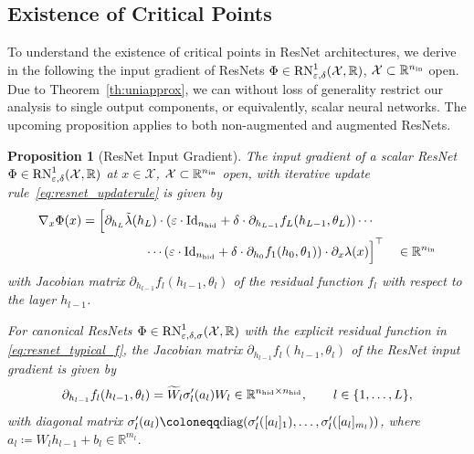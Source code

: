 \documentclass[10pt]{article}
\newtheorem{proposition}[theorem]{Proposition}
\theoremstyle{definition}
\numberwithin{equation}{section}
\newcommand{\eps}{\varepsilon}
\newcommand{\R}{\mathbb{R}}
\newcommand*{\nhid}{n_\textup{hid}}
\newcommand*{\nin}{n_\textup{in}}
\begin{document}
\subsection{Existence of Critical Points}
\label{sec:resnet_gradient}

To understand the existence of critical points in ResNet architectures, we derive in the following the input gradient of ResNets $\Phi \in \textup{RN}_{\eps,\delta}^1(\mathcal{X},\R)$, $\mathcal{X}\subset \R^{\nin}$ open. Due to Theorem~\ref{th:uniapprox}, we can without loss of generality restrict our analysis to single output components, or equivalently, scalar neural networks. The upcoming proposition applies to both non-augmented and augmented ResNets.  

\begin{proposition}[ResNet Input Gradient] \label{prop:resnet_gradient}
	The input gradient of a scalar ResNet $\Phi \in \textup{RN}^1_{\eps,\delta}(\mathcal{X},\R)$ at $x \in \mathcal{X}$, $\mathcal{X}\subset \R^{\nin}$ open, with iterative update rule~\eqref{eq:resnet_updaterule} is given by
	\begin{equation}
    \begin{aligned}
		\nabla_x \Phi(x) & = \Bigl[ \partial_{h_L}\tilde{\lambda}(h_L) \cdot (\eps \cdot \textup{Id}_{\nhid} + \delta \cdot \partial_{h_{L-1}} f_L(h_{L-1},\theta_L)) \cdots \Bigr. \\
		&\hspace{17.5mm} \cdots \Bigl. (\eps \cdot \textup{Id}_{\nhid} + \delta \cdot \partial_{h_{0}} f_1(h_{0},\theta_1))\cdot \partial_x\lambda(x)\Bigr]^\top \quad \in \R^{\nin} \label{eq:resnet_gradient}
	\end{aligned}
    \end{equation}
	with Jacobian matrix $\partial_{h_{l-1}}f_l(h_{l-1},\theta_l)$ of the residual function $f_l$ with respect to the layer $h_{l-1}$. 
	
	For canonical ResNets $\Phi \in \textup{RN}^1_{\eps,\delta,\sigma}(\mathcal{X},\R)$ with the explicit residual function in \eqref{eq:resnet_typical_f}, the Jacobian matrix $\partial_{h_{l-1}}f_l(h_{l-1},\theta_l)$ of the ResNet input gradient is given by
	\begin{equation*}
		\partial_{h_{l-1}}f_l(h_{l-1},\theta_l) =  \widetilde{W}_{l}\sigma'_{l}(a_{l})W_{l} \in \R^{\nhid \times \nhid}, \qquad l\in \{1,\ldots,L\},
	\end{equation*}
	with diagonal matrix $\sigma'_l(a_{l}) \coloneqq \textup{diag}(\sigma_l'([a_l]_1),\ldots, \sigma_l'([a_l]_{m_l}))$, where $a_l \coloneqq W_l h_{l-1} + b_l \in \R^{m_l}$.
\end{proposition}
\end{document}
